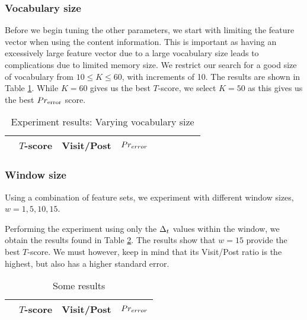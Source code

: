 \subsubsection{Vocabulary size}
Before we begin tuning the other parameters, we start with limiting the feature 
vector when using the content information. This is important as having an 
excessively large feature vector due to a large vocabulary size leads to 
complications due to limited memory size. We restrict our search for a good size 
of vocabulary from $10 \leq K \leq 60$, with increments of 10.  The results are 
shown in Table \ref{table:vocab_exp}. While $K=60$ gives us the best $T$-score, 
we select $K=50$ as this gives us the best $Pr_{\text{error}}$ score.  
\begin{table}
	\footnotesize
\begin{center}
	\begin{tabular}{|l|c|c|c|c|c|c|c|c|}
	\hline
& $T$-score			   &	Visit/Post & 	$Pr_{error}$\\
	\hline
	
	\hline
	\end{tabular}
\end{center}
	\caption{Experiment results: Varying vocabulary size}
	\label{table:vocab_exp}
\end{table}



\subsubsection{Window size}
Using a combination of feature sets, we experiment with different window sizes, 
$w = 1, 5, 10, 15$.

Performing the experiment using only the $\Delta_t$ values within the window, we 
obtain the results found in Table \ref{tbl:par_tune_dt}. The results show that 
$w=15$ provide the best $T$-score. We must however, keep in mind that its 
Visit/Post ratio is the highest, but also has a higher standard error.

\begin{table}
	\footnotesize
\begin{center}
\begin{tabular}{| l | c | c | c |}
\hline
& $T$-score			   &	Visit/Post & 	$Pr_{error}$\\
\hline
	
\hline
\end{tabular}
\end{center}
\caption{Some results}\label{tbl:par_tune_dt}
\end{table}

